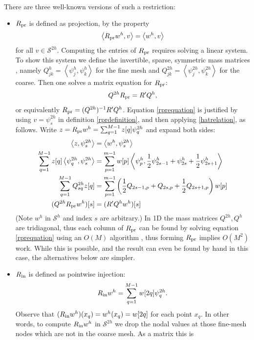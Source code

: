 \documentclass[letterpaper,final,12pt,reqno]{amsart}
\newcommand{\ip}[2]{\left<#1,#2\right>}
\begin{document}
There are three well-known versions of such a restriction:
\begin{itemize}
\item $R_{\text{pr}}$ is defined as projection, by the property
\begin{equation}
  \ip{\Rpr w^h}{v} = \ip{w^h}{v} \label{rprdefinition}
\end{equation}
for all $v\in \mathcal{S}^{2h}$.  Computing the entries of $R_{\text{pr}}$ requires solving a linear system.  To show this system we define the invertible, sparse, symmetric mass matrices \cite{Elmanetal2014}, namely $Q_{jk}^{h} = \ip{\psi_j^{h}}{\psi_k^{h}}$ for the fine mesh and $Q_{jk}^{2h} = \ip{\psi_j^{2h}}{\psi_k^{2h}}$ for the coarse.  Then one solves a matrix equation for $R_{\text{pr}}$:
\begin{equation}
  Q^{2h} R_{\text{pr}} = R' Q^{h},  \label{rprequation}
\end{equation}
or equivalently $R_{\text{pr}} = (Q^{2h})^{-1} R' Q^{h}$.  Equation \eqref{rprequation} is justified by using $v=\psi_s^{2h}$ in definition \eqref{rprdefinition}, and then applying \eqref{hatrelation}, as follows.  Write $z = R_{\text{pr}} w^h = \sum_{q=1}^{M-1} z[q] \psi_q^{2h}$ and expand both sides:
\begin{align*}
\ip{z}{\psi_s^{2h}} &= \ip{w^h}{\psi_s^{2h}} \\
\sum_{q=1}^{M-1} z[q] \ip{\psi_q^{2h}}{\psi_s^{2h}} &= \sum_{p=1}^{m-1} w[p] \ip{\psi_p^{h}}{\frac{1}{2} \psi_{2s-1}^{h} + \psi_{2s}^{h} + \frac{1}{2} \psi_{2s+1}^{h}} \\
\sum_{q=1}^{M-1} Q_{sq}^{2h} z[q] &= \sum_{p=1}^{m-1} \left(\frac{1}{2} Q_{2s-1,p} + Q_{2s,p} + \frac{1}{2} Q_{2s+1,p}\right) w[p] \\
(Q^{2h} \Rpr w^h)[s] &= (R' Q^h w^h)[s]
\end{align*}
(Note $w^h$ in $\mathcal{S}^h$ and index $s$ are arbitrary.)  In 1D the mass matrices $Q^{2h},Q^h$ are tridiagonal, thus each column of $R_{\text{pr}}$ can be found by solving equation \eqref{rprequation} using an $O(M)$ algorithm \cite{TrefethenBau1997}, thus forming $R_{\text{pr}}$ implies $O(M^2)$ work.  While this is possible, and the result can even be found by hand in this case, the alternatives below are simpler.
\item $R_{\text{in}}$ is defined as pointwise injection:
\begin{equation}
  R_{\text{in}} w^h = \sum_{q=1}^{M-1} w[2q] \psi_q^{2h}. \label{rindefinition}
\end{equation}
Observe that $(R_{\text{in}} w^h)(x_q) = w^h(x_q) = w[2q]$ for each point $x_q$.  In other words, to compute $R_{\text{in}} w^h$ in $\mathcal{S}^{2h}$ we drop the nodal values at those fine-mesh nodes which are not in the coarse mesh.  As a matrix this is

\end{itemize}
\end{document}
